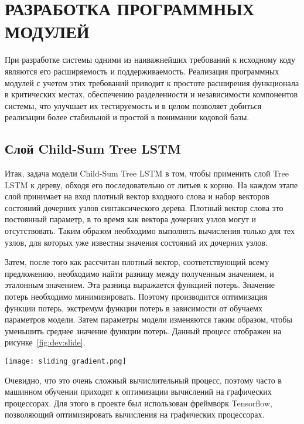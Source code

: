 \section{РАЗРАБОТКА ПРОГРАММНЫХ МОДУЛЕЙ}
\label{sec:development}
При разработке системы одними из наиважнейших требований к исходному коду являются его расширяемость и поддерживаемость. Реализация программных модулей с учетом этих требований приводит к простоте расширения функционала в критических местах, обеспечению разделенности и независимости компонентов системы, что улучшает их тестируемость и в целом позволяет добиться реализации более стабильной и простой в понимании кодовой базы.

\subsection{Слой Child-Sum Tree LSTM}
Итак, задача модели Child-Sum Tree LSTM в том, чтобы применить слой Tree LSTM к дереву, обходя его последовательно от литьев к корню. На каждом этапе слой принимает на вход плотный вектор входного слова и набор векторов состояний дочерних узлов синтаксического дерева. Плотный вектор слова это постоянный параметр, в то время как вектора дочерних узлов могут и отсутствовать. Таким образом необходимо выполнять вычисления только для тех узлов, для которых уже известны значения состояний их дочерних узлов.

Затем, после того как рассчитан плотный вектор, соответствующий всему предложению, необходимо найти разницу между полученным значением, и эталонным значением. Эта разница выражается функцией потерь. Значение потерь необходимо минимизировать. Поэтому производится оптимизация функции потерь, экстремум функции потерь в зависимости от обучаемх параметров модели. Затем параметры модели изменяются таким образом, чтобы уменьшить среднее значение функции потерь. Данный процесс отображен на рисунке~\ref{fig:dev:slide}.

\begin{center}
  \texttt{[image: sliding\_gradient.png]}
  \label{fig:dev:slide}
\end{center}

Очевидно, что это очень сложный вычислительный процесс, поэтому часто в машинном обучении приходят к оптимизации вычислений на графических процессорах. Для этого в проекте был использован фреймворк Tensor\-flow, позволяющий оптимизировать вычисления на графических процессорах.


